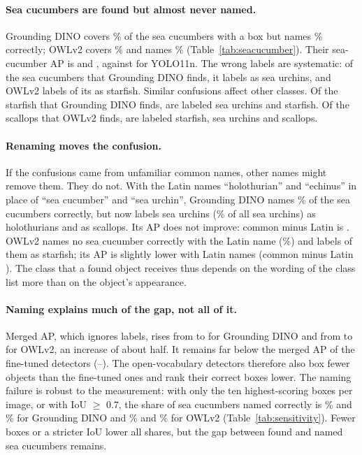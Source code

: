 \documentclass[letterpaper]{article} %
\begin{document}
\paragraph{Sea cucumbers are found but almost never named.}
Grounding DINO covers \scFoundGD\% \scFoundciGD{} of the sea cucumbers with a box but names \scNamedGD\% \scNamedciGD{} correctly; OWLv2 covers \scFoundOWL\% \scFoundciOWL{} and names \scNamedOWL\% \scNamedciOWL{} (Table~\ref{tab:seacucumber}). Their sea-cucumber AP is \scApGD{} and \scApOWL{}, against \scApYoloN{} for YOLO11n. The wrong labels are systematic: of the \scFoundNGD{} sea cucumbers that Grounding DINO finds, it labels \scUrchinGD{} as sea urchins, and OWLv2 labels \scStarOWL{} of its \scFoundNOWL{} as starfish. Similar confusions affect other classes. Of the starfish that Grounding DINO finds, \starAsUrchinGD{} are labeled sea urchins and \starAsStarGD{} starfish. Of the scallops that OWLv2 finds, \scalAsStarOWL{} are labeled starfish, \scalAsUrchinOWL{} sea urchins and \scalAsScalOWL{} scallops.

\paragraph{Renaming moves the confusion.}
If the confusions came from unfamiliar common names, other names might remove them. They do not. With the Latin names ``holothurian'' and ``echinus'' in place of ``sea cucumber'' and ``sea urchin'', Grounding DINO names \scNamedGDlatin\% of the sea cucumbers correctly, but now labels \urchinAsHoloGDlatin{} sea urchins (\urchinAsHoloGDlatinPct\% of all sea urchins) as holothurians and \urchinAsScalGDlatin{} as scallops. Its AP does not improve: common minus Latin is \dLatinGd{} \dciLatinGd. OWLv2 names no sea cucumber correctly with the Latin name (\scNamedOWLlatin\%) and labels \scStarOWLlatin{} of them as starfish; its AP is slightly lower with Latin names (common minus Latin \dLatinOwl{} \dciLatinOwl). The class that a found object receives thus depends on the wording of the class list more than on the object's appearance.

\paragraph{Naming explains much of the gap, not all of it.}
Merged AP, which ignores labels, rises from \apGD{} to \mgGD{} \mgciGD{} for Grounding DINO and from \apOWL{} to \mgOWL{} \mgciOWL{} for OWLv2, an increase of about half. It remains far below the merged AP of the fine-tuned detectors (\mgYoloEightN--\mgYoloL). The open-vocabulary detectors therefore also box fewer objects than the fine-tuned ones and rank their correct boxes lower. The naming failure is robust to the measurement: with only the ten highest-scoring boxes per image, or with IoU $\geq$ 0.7, the share of sea cucumbers named correctly is \scNamedTopTenGD\% and \scNamedIouSeventyGD\% for Grounding DINO and \scNamedTopTenOWL\% and \scNamedIouSeventyOWL\% for OWLv2 (Table~\ref{tab:sensitivity}). Fewer boxes or a stricter IoU lower all shares, but the gap between found and named sea cucumbers remains.
\end{document}
